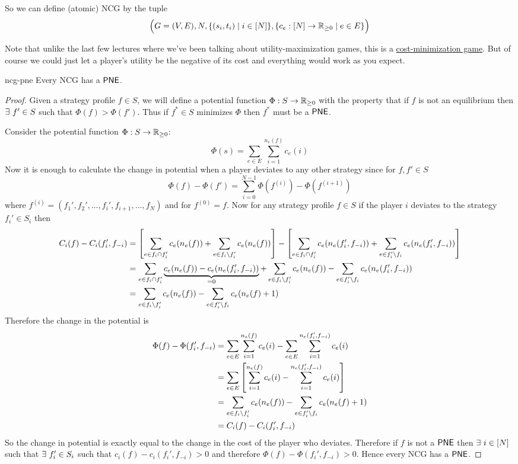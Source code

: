 So we can define (atomic) NCG by the tuple $$\Big(G=(V,E),N,\{(s_i,t_i)\mid i\in[N]\}, \{c_e:[N]\to \mathbb{R}_{\geq 0}\mid e\in E\}\Big)$$

Note that unlike the last few lectures where we’ve been talking about utility-maximization games,
this is a \hyperref[def:cost-min-game]{cost-minimization game}. But of course we could just let a player’s utility be the negative
of its cost and everything would work as you expect.
\begin{lemma}{}{ncg-pne}
	Every NCG has a $\operatorname{\mathsf{PNE}}$.
\end{lemma}
\begin{proof}
	Given a strategy profile $f\in S$, we will define a potential function $\Phi:S\to\mathbb{R}_{\geq 0}$ with the property that if $f$ is not an equilibrium then $\exists\ f'\in S$ such that $\Phi(f)>\Phi(f')$. Thus if $f^*\in S$ minimizes $\Phi$ then $f^*$ must be a $\operatorname{\mathsf{PNE}}$.
	
	Consider the potential function $\Phi:S\to\mathbb{R}_{\geq 0}$: $$\Phi(s)=\sum_{e\in E}\sum_{i=1}^{n_e(f)}c_e(i)$$Now it is enough to calculate the change in potential when a player deviates to any other strategy since for $f,f'\in S$ $$\Phi(f)-\Phi(f')=\sum_{i=0}^{N-1} \Phi(f^{(i)})-\Phi(f^{(i+1)})$$ where $f^{(i)}=(f_1',f_2',\dots, f_i',f_{i+1},\dots, f_N)$ and for $f^{(0)}=f$. Now for any strategy profile $f\in S$ if the player $i$ deviates to the strategy $f_i'\in S_i$ then \begin{align*}
		C_i(f)-C_i(f'_i,f_{-i}) & = \left[  \sum_{e\in f_i\cap f_i'}c_e(n_e(f))+\sum_{e\in f_i\setminus f_i'}c_e(n_e(f))\right]-\left[  \sum_{e\in f_i\cap f_i'}c_e(n_e(f_i',f_{-i}))+\sum_{e\in f_i'\setminus f_i}c_e(n_e(f_i',f_{-i}))\right]\\
		&=  \sum_{e\in f_i\cap f_i'}\underbrace{c_e(n_e(f))-c_e(n_e(f_i',f_{-i}))}_{=0} + \sum_{e\in f_i\setminus f_i'}c_e(n_e(f))-\sum_{e\in f_i'\setminus f_i}c_e(n_e(f_i',f_{-i}))\\
		& = \sum_{e\in f_i\setminus f_i'}c_e(n_e(f))-\sum_{e\in f_i'\setminus f_i}c_e(n_e(f)+1)\\
	\end{align*}Therefore the change in the potential is \begin{align*}
	\Phi(f)-\Phi(f_i',f_{-i}) & = \sum_{e\in E}\sum_{i=1}^{n_e(f)} c_e(i)-\sum_{e\in E}\sum_{i=1}^{n_e(f_i',f_{-i})} c_e(i)\\
	& =\sum_{e\in E}\left[\sum_{i=1}^{n_e(f)} c_e(i)-\sum_{i=1}^{n_e(f_i',f_{-i})} c_e(i)\right]\\
	&=\sum_{e\in f_i\setminus f_i'}c_e(n_e(f))-\sum_{e\in f_i'\setminus f_i}c_e(n_e(f)+1)\\
	& = C_i(f)-C_i(f'_i,f_{-i})
\end{align*}So the change in potential is exactly equal to the change in the cost of the player who deviates. Therefore if $f$ is not a $\operatorname{\mathsf{PNE}}$ then $\exists\ i\in[N]$ such that $\exists\ f_i'\in S_i$ such that $c_i(f)-c_i(f_i',f_{-i})>0$ and therefore $\Phi(f)-\Phi(f_i',f_{-i})>0$. Hence every NCG has a $\operatorname{\mathsf{PNE}}$.
\end{proof}

